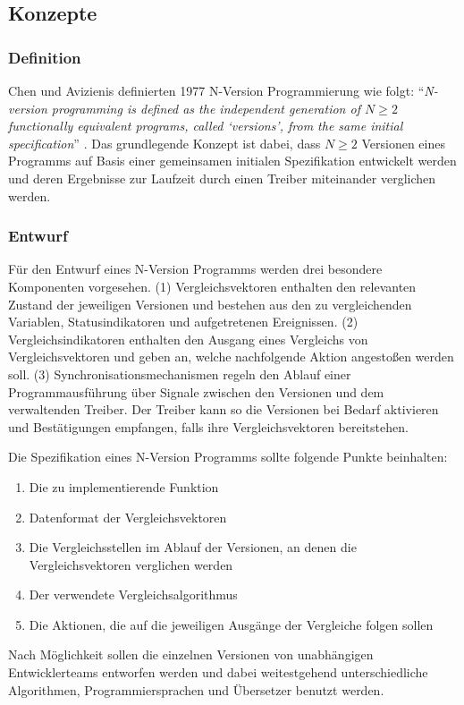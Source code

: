 \subsection{Konzepte} \label{konzepte}

\subsubsection{Definition}
Chen und Avizienis definierten 1977 N-Version Programmierung wie folgt: \enquote{\emph{N-version programming is defined as the independent generation of $ N \geq 2 $ functionally equivalent programs, called \enquote{versions}, from the same initial specification}} \cite{Chen1978}.
Das grundlegende Konzept ist dabei, dass $ N \geq 2 $ Versionen eines Programms auf Basis einer gemeinsamen initialen Spezifikation entwickelt werden und deren Ergebnisse zur Laufzeit durch einen Treiber miteinander verglichen werden.
%

%
\subsubsection{Entwurf}
Für den Entwurf eines N-Version Programms werden drei besondere Komponenten vorgesehen.
(1) Vergleichsvektoren enthalten den relevanten Zustand der jeweiligen Versionen und bestehen aus den zu vergleichenden Variablen, Statusindikatoren und aufgetretenen Ereignissen.
(2) Vergleichsindikatoren enthalten den Ausgang eines Vergleichs von Vergleichsvektoren und geben an, welche nachfolgende Aktion angestoßen werden soll. 
(3) Synchronisationsmechanismen regeln den Ablauf einer Programmausführung über Signale zwischen den Versionen und dem verwaltenden Treiber. Der Treiber kann so die Versionen bei Bedarf aktivieren und Bestätigungen empfangen, falls ihre Vergleichsvektoren bereitstehen.

Die Spezifikation eines N-Version Programms sollte folgende Punkte beinhalten:
\begin{enumerate}
	\item Die zu implementierende Funktion
	\item Datenformat der Vergleichsvektoren
	\item Die Vergleichsstellen im Ablauf der Versionen, an denen die Vergleichsvektoren verglichen werden
	\item Der verwendete Vergleichsalgorithmus
	\item Die Aktionen, die auf die jeweiligen Ausgänge der Vergleiche folgen sollen
\end{enumerate}
%
Nach Möglichkeit sollen die einzelnen Versionen von unabhängigen Entwicklerteams entworfen werden und dabei weitestgehend unterschiedliche Algorithmen, Programmiersprachen und Übersetzer benutzt werden.


